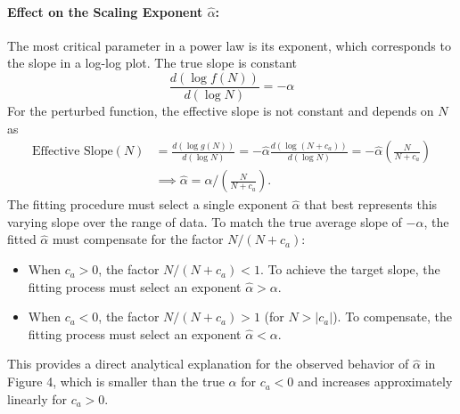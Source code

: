 \paragraph{Effect on the Scaling Exponent $\hat{\alpha}$:}
The most critical parameter in a power law is its exponent, which corresponds to the slope in a log-log plot. The true slope is constant
\begin{equation}
    \frac{d(\log f(N))}{d(\log N)} = -\alpha
\end{equation}
For the perturbed function, the effective slope is not constant and depends on $N$ as
\begin{align}
    \text{Effective Slope}(N) &= \frac{d(\log g(N))}{d(\log N)} = -\hat{\alpha} \frac{d(\log(N+c_a))}{d(\log N)} = -\hat{\alpha} \left( \frac{N}{N+c_a} \right)
    \\ \nonumber
    &\implies \hat{\alpha}=\alpha/\left( \frac{N}{N+c_a} \right).
\end{align}
The fitting procedure must select a single exponent $\hat{\alpha}$ that best represents this varying slope over the range of data. To match the true average slope of $-\alpha$, the fitted $\hat{\alpha}$ must compensate for the factor $N/(N+c_a)$:
\begin{itemize}
    \item When $c_a > 0$, the factor $N/(N+c_a) < 1$. To achieve the target slope, the fitting process must select an exponent $\hat{\alpha} > \alpha$.
    \item When $c_a < 0$, the factor $N/(N+c_a) > 1$ (for $N>|c_a|$). To compensate, the fitting process must select an exponent $\hat{\alpha} < \alpha$.
\end{itemize}
This provides a direct analytical explanation for the observed behavior of $\hat{\alpha}$ in Figure 4, which is smaller than the true $\alpha$ for $c_a<0$ and increases approximately linearly for $c_a>0$.

